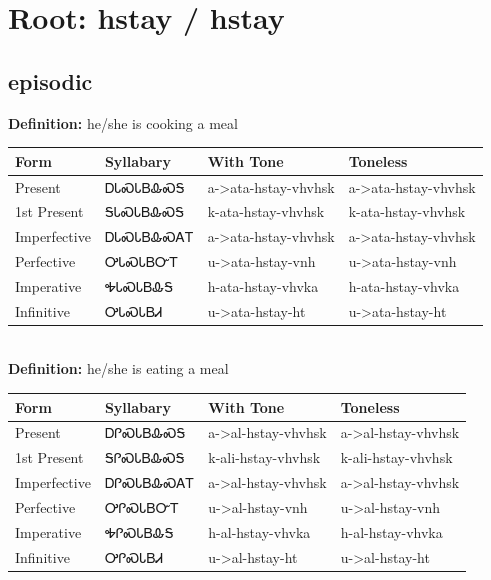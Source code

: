 \documentclass{article}%
\begin{document}
%
\normalsize%
\section*{Root: hstay / hstay}%
\subsection*{episodic}%
\textbf{Definition: }%
he/she is cooking a meal%
\\[0.5em]%
\begin{tabular}{|l|l|l|l|}%
\hline%
\textbf{Form}&\textbf{Syllabary}&\textbf{With Tone}&\textbf{Toneless}\\%
\hline%
Present&ᎠᏓᏍᏓᏴᎲᏍᎦ&a{-}>ata{-}hstay{-}vhvhsk&a{-}>ata{-}hstay{-}vhvhsk\\%
1st Present&ᎦᏓᏍᏓᏴᎲᏍᎦ&k{-}ata{-}hstay{-}vhvhsk&k{-}ata{-}hstay{-}vhvhsk\\%
Imperfective&ᎠᏓᏍᏓᏴᎲᏍᎪᎢ&a{-}>ata{-}hstay{-}vhvhsk&a{-}>ata{-}hstay{-}vhvhsk\\%
Perfective&ᎤᏓᏍᏓᏴᏅᎢ&u{-}>ata{-}hstay{-}vnh&u{-}>ata{-}hstay{-}vnh\\%
Imperative&ᎭᏓᏍᏓᏴᎲᎦ&h{-}ata{-}hstay{-}vhvka&h{-}ata{-}hstay{-}vhvka\\%
Infinitive&ᎤᏓᏍᏓᏴᏗ&u{-}>ata{-}hstay{-}ht&u{-}>ata{-}hstay{-}ht\\%
\hline%
\end{tabular}%
\\[1em]%
\textbf{Definition: }%
he/she is eating a meal%
\\[0.5em]%
\begin{tabular}{|l|l|l|l|}%
\hline%
\textbf{Form}&\textbf{Syllabary}&\textbf{With Tone}&\textbf{Toneless}\\%
\hline%
Present&ᎠᎵᏍᏓᏴᎲᏍᎦ&a{-}>al{-}hstay{-}vhvhsk&a{-}>al{-}hstay{-}vhvhsk\\%
1st Present&ᎦᎵᏍᏓᏴᎲᏍᎦ&k{-}ali{-}hstay{-}vhvhsk&k{-}ali{-}hstay{-}vhvhsk\\%
Imperfective&ᎠᎵᏍᏓᏴᎲᏍᎪᎢ&a{-}>al{-}hstay{-}vhvhsk&a{-}>al{-}hstay{-}vhvhsk\\%
Perfective&ᎤᎵᏍᏓᏴᏅᎢ&u{-}>al{-}hstay{-}vnh&u{-}>al{-}hstay{-}vnh\\%
Imperative&ᎭᎵᏍᏓᏴᎲᎦ&h{-}al{-}hstay{-}vhvka&h{-}al{-}hstay{-}vhvka\\%
Infinitive&ᎤᎵᏍᏓᏴᏗ&u{-}>al{-}hstay{-}ht&u{-}>al{-}hstay{-}ht\\%
\hline%
\end{tabular}%
\\[1em]%
\end{document}
